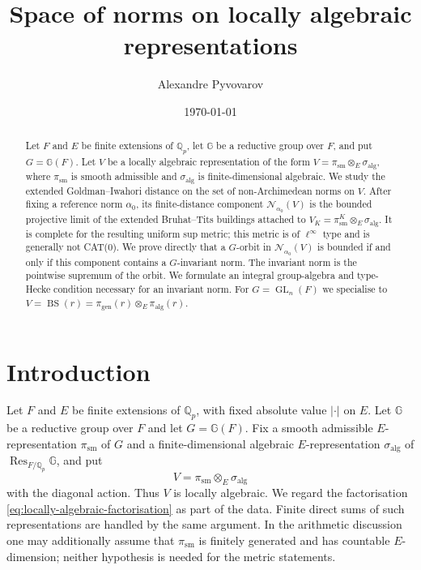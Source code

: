 \documentclass[12pt]{article}
\title{Space of norms on locally algebraic representations}
\author{Alexandre Pyvovarov}
\date{\today}
\theoremstyle{definition}
\theoremstyle{remark}
\newcommand{\Qp}{\mathbb Q_p}
\newcommand{\Norm}{\mathscr N}
\DeclareMathOperator{\GL}{GL}
\begin{document}
\maketitle

\begin{abstract}
Let $F$ and $E$ be finite extensions of $\Qp$, let $\mathbb G$ be a
reductive group over $F$, and put $G=\mathbb G(F)$.  Let $V$ be a
locally algebraic representation of the form
$V=\pi_{\mathrm{sm}}\otimes_E\sigma_{\mathrm{alg}}$, where
$\pi_{\mathrm{sm}}$ is smooth admissible and
$\sigma_{\mathrm{alg}}$ is finite-dimensional algebraic.  We study the
extended Goldman--Iwahori distance on the set of non-Archimedean norms
on $V$.  After fixing a reference norm $\alpha_0$, its finite-distance
component $\Norm_{\alpha_0}(V)$ is the bounded projective limit of the
extended Bruhat--Tits buildings attached to
$V_K=\pi_{\mathrm{sm}}^K\otimes_E\sigma_{\mathrm{alg}}$.  It is complete
for the resulting uniform sup metric; this metric is of $\ell^\infty$
type and is generally not CAT(0).  We prove directly that a $G$-orbit in
$\Norm_{\alpha_0}(V)$ is bounded if and only if this component contains a
$G$-invariant norm.  The invariant norm is the pointwise supremum of the
orbit.  We formulate an integral group-algebra and type-Hecke condition
necessary for an invariant norm.  For $G=\GL_n(F)$ we specialise to
$V=\operatorname{BS}(r)=\pi_{\mathrm{gen}}(r)\otimes_E
\pi_{\mathrm{alg}}(r)$.
\end{abstract}

\tableofcontents

\section{Introduction}

Let $F$ and $E$ be finite extensions of $\Qp$, with fixed absolute value
$|\cdot|$ on $E$.  Let $\mathbb G$ be a reductive group over $F$ and let
$G=\mathbb G(F)$.  Fix a smooth admissible $E$-representation
$\pi_{\mathrm{sm}}$ of $G$ and a finite-dimensional algebraic
$E$-representation $\sigma_{\mathrm{alg}}$ of
$\operatorname{Res}_{F/\Qp}\mathbb G$, and put
\begin{equation}\label{eq:locally-algebraic-factorisation}
  V=\pi_{\mathrm{sm}}\otimes_E\sigma_{\mathrm{alg}}
\end{equation}
with the diagonal action.  Thus $V$ is locally algebraic.  We regard
the factorisation \eqref{eq:locally-algebraic-factorisation} as part of
the data.  Finite direct sums of such representations are handled by
the same argument.  In the arithmetic discussion one may additionally
assume that $\pi_{\mathrm{sm}}$ is finitely generated and has countable
$E$-dimension; neither hypothesis is needed for the metric statements.
\end{document}
